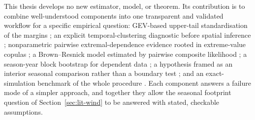 This thesis develops no new estimator, model, or theorem. Its contribution is to combine well-understood components into one transparent and validated workflow for a specific empirical question: GEV-based upper-tail standardisation of the margins \citep{fisher1928,gnedenko1943,coles2001}; an explicit temporal-clustering diagnostic before spatial inference \citep{ferro2003}; nonparametric pairwise extremal-dependence evidence rooted in extreme-value copulas \citep{coles1999,schlather2003}; a Brown--Resnick model estimated by pairwise composite likelihood \citep{kabluchko2009,padoan2010,huser2013}; a season-year block bootstrap for dependent data \citep{kuensch1989,lahiri2003}; a hypothesis framed as an interior seasonal comparison rather than a boundary test \citep{andrews2001}; and an exact-simulation benchmark of the whole procedure \citep{dombry2016}. Each component answers a failure mode of a simpler approach, and together they allow the seasonal footprint question of Section~\ref{sec:lit-wind} to be answered with stated, checkable assumptions.